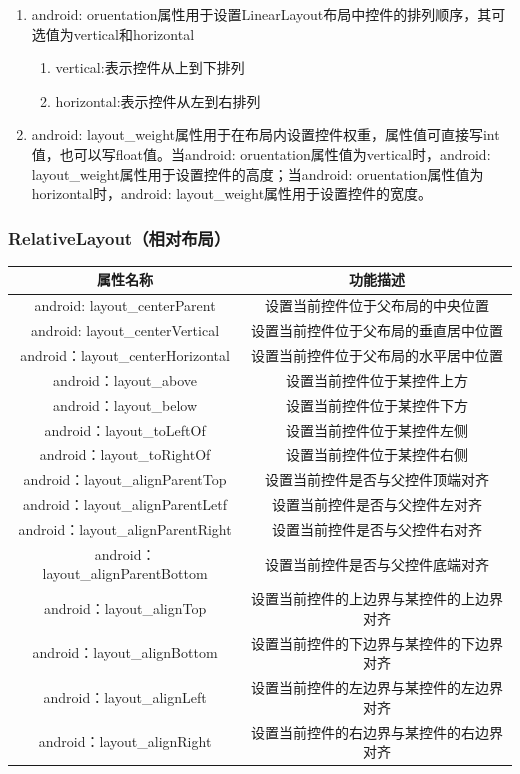 \documentclass[UTF8,12pt]{article}
\begin{document}
\begin{enumerate}
    \item android: oruentation属性用于设置LinearLayout布局中控件的排列顺序，其可选值为vertical和horizontal
    \begin{enumerate}
        \item vertical:表示控件从上到下排列
        \item horizontal:表示控件从左到右排列
    \end{enumerate}
    \item android: layout\_weight属性用于在布局内设置控件权重，属性值可直接写int值，也可以写float值。当android: oruentation属性值为vertical时，android: layout\_weight属性用于设置控件的高度；当android: oruentation属性值为horizontal时，android: layout\_weight属性用于设置控件的宽度。
\end{enumerate}

\subsubsection{RelativeLayout（相对布局）}
\begin{table}[htbp]
    \centering
    \begin{tabular}{cc}
    \hline
    \textbf{属性名称}                     & \textbf{功能描述}        \\ \hline
    android: layout\_centerParent     & 设置当前控件位于父布局的中央位置     \\
    android: layout\_centerVertical   & 设置当前控件位于父布局的垂直居中位置   \\
    android：layout\_centerHorizontal  & 设置当前控件位于父布局的水平居中位置   \\
    android：layout\_above             & 设置当前控件位于某控件上方        \\
    android：layout\_below             & 设置当前控件位于某控件下方        \\
    android：layout\_toLeftOf          & 设置当前控件位于某控件左侧        \\
    android：layout\_toRightOf         & 设置当前控件位于某控件右侧        \\
    android：layout\_alignParentTop    & 设置当前控件是否与父控件顶端对齐     \\
    android：layout\_alignParentLetf   & 设置当前控件是否与父控件左对齐      \\
    android：layout\_alignParentRight  & 设置当前控件是否与父控件右对齐      \\
    android：layout\_alignParentBottom & 设置当前控件是否与父控件底端对齐     \\
    android：layout\_alignTop          & 设置当前控件的上边界与某控件的上边界对齐 \\
    android：layout\_alignBottom       & 设置当前控件的下边界与某控件的下边界对齐 \\
    android：layout\_alignLeft         & 设置当前控件的左边界与某控件的左边界对齐 \\
    android：layout\_alignRight        & 设置当前控件的右边界与某控件的右边界对齐 \\ \hline
    \end{tabular}
\end{table}
\end{document}
